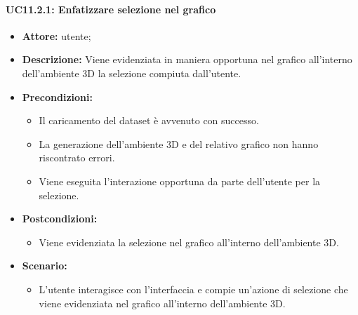 \paragraph{UC11.2.1: Enfatizzare selezione nel grafico}
\begin{itemize}    
    \item \textbf{Attore:} utente;
    \item \textbf{Descrizione:} Viene evidenziata in maniera opportuna nel grafico all'interno dell'ambiente 3D la selezione compiuta dall'utente.
    \item \textbf{Precondizioni:}    
        \begin{itemize}
            \item Il caricamento del dataset è avvenuto con successo.
            \item La generazione dell'ambiente 3D e del relativo grafico non hanno riscontrato errori.
            \item Viene eseguita l'interazione opportuna da parte dell'utente per la selezione.
        \end{itemize}    
    \item \textbf{Postcondizioni:}
        \begin{itemize}
            \item Viene evidenziata la selezione nel grafico all'interno dell'ambiente 3D.
        \end{itemize}    
    \item \textbf{Scenario:} 
        \begin{itemize}
            \item L'utente interagisce con l'interfaccia e compie un'azione di selezione che viene evidenziata nel grafico all'interno dell'ambiente 3D.
        \end{itemize}
\end{itemize}
